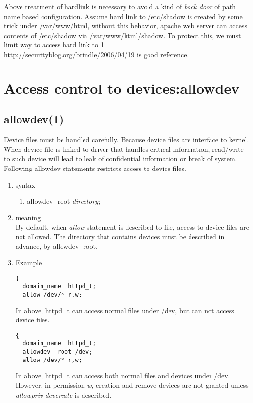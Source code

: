 \documentclass{article}
\begin{document}
       Above treatment of hardlink is necessary to avoid a kind of {\it back door }
       of path name based configuration. Assume hard link to
       /etc/shadow is created by some trick under /var/www/html, without this
       behavior, apache web server can access contents of /etc/shadow
       via /var/www/html/shadow. To protect this, we must limit way to access
       hard link to 1.\\
       http://securityblog.org/brindle/2006/04/19 is good reference.\\



\section{Access control to devices:allowdev}
\subsection{allowdev(1)}
 Device files must be handled carefully. Because device files are
interface to kernel. When device file is linked to driver that handles
critical information, read/write to such device will lead to leak of
confidential information or break of system. Following allowdev
statements restricts access to device files.
\begin{enumerate}
 \item syntax
      \begin{enumerate}
       \item allowdev -root {\it directory};
      \end{enumerate}
 \item meaning\\
	By default, when {\it allow} statement is described to file,
	access to device files are not allowed. The directory that
	contains devices must be described in advance, by allowdev
	-root.

 \item Example\\
\begin{verbatim}
{
  domain_name  httpd_t;
  allow /dev/* r,w;
\end{verbatim}
       In above, httpd\_t can access normal files under /dev, but can
       not access device files.
\begin{verbatim}
{
  domain_name  httpd_t;
  allowdev -root /dev;
  allow /dev/* r,w;
\end{verbatim}
       In above, httpd\_t can access both normal files and devices under
       /dev.
       However, in permission {\it w}, creation and remove devices are not granted unless {\it allowpriv devcreate } is described. 
\end{enumerate}
\end{document}
